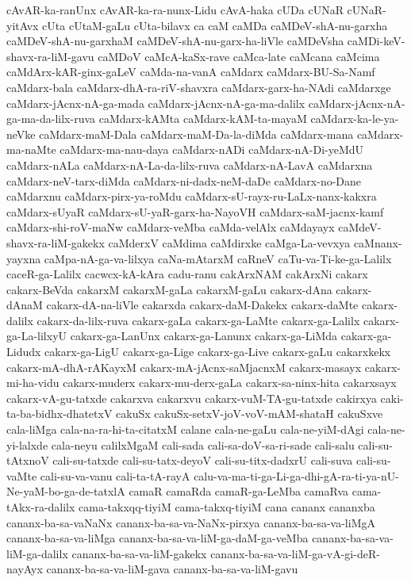 {cAvAR-ka-ranUnx
cAvAR-ka-ra-nunx-Lidu
cAvA-haka
cUDa
cUNaR
cUNaR-yitAvx
cUta
cUtaM-gaLu
cUta-bilavx
ca
caM
caMDa
caMDeV-shA-nu-garxha
caMDeV-shA-nu-garxhaM
caMDeV-shA-nu-garx-ha-liVle
caMDeVsha
caMDi-keV-shavx-ra-liM-gavu
caMDoV
caMcA-kaSx-rave
caMca-late
caMcana
caMcima
caMdArx-kAR-ginx-gaLeV
caMda-na-vanA
caMdarx
caMdarx-BU-Sa-Namf
caMdarx-bala
caMdarx-dhA-ra-riV-shavxra
caMdarx-garx-ha-NAdi
caMdarxge
caMdarx-jAcnx-nA-ga-mada
caMdarx-jAcnx-nA-ga-ma-dalilx
caMdarx-jAcnx-nA-ga-ma-da-lilx-ruva
caMdarx-kAMta
caMdarx-kAM-ta-mayaM
caMdarx-ka-le-ya-neVke
caMdarx-maM-Dala
caMdarx-maM-Da-la-diMda
caMdarx-mana
caMdarx-ma-naMte
caMdarx-ma-nau-daya
caMdarx-nADi
caMdarx-nA-Di-yeMdU
caMdarx-nALa
caMdarx-nA-La-da-lilx-ruva
caMdarx-nA-LavA
caMdarxna
caMdarx-neV-tarx-diMda
caMdarx-ni-dadx-neM-daDe
caMdarx-no-Dane
caMdarxnu
caMdarx-pirx-ya-roMdu
caMdarx-sU-rayx-ru-LaLx-nanx-kakxra
caMdarx-sUyaR
caMdarx-sU-yaR-garx-ha-NayoVH
caMdarx-saM-jacnx-kamf
caMdarx-shi-roV-maNw
caMdarx-veMba
caMda-velAlx
caMdayayx
caMdeV-shavx-ra-liM-gakekx
caMderxV
caMdima
caMdirxke
caMga-La-vevxya
caMnanx-yayxna
caMpa-nA-ga-va-lilxya
caNa-mAtarxM
caRneV
caTu-va-Ti-ke-ga-Lalilx
caceR-ga-Lalilx
cacwcx-kA-kAra
cadu-ranu
cakArxNAM
cakArxNi
cakarx
cakarx-BeVda
cakarxM
cakarxM-gaLa
cakarxM-gaLu
cakarx-dAna
cakarx-dAnaM
cakarx-dA-na-liVle
cakarxda
cakarx-daM-Dakekx
cakarx-daMte
cakarx-dalilx
cakarx-da-lilx-ruva
cakarx-gaLa
cakarx-ga-LaMte
cakarx-ga-Lalilx
cakarx-ga-La-lilxyU
cakarx-ga-LanUnx
cakarx-ga-Lanunx
cakarx-ga-LiMda
cakarx-ga-Lidudx
cakarx-ga-LigU
cakarx-ga-Lige
cakarx-ga-Live
cakarx-gaLu
cakarxkekx
cakarx-mA-dhA-rAKayxM
cakarx-mA-jAcnx-saMjacnxM
cakarx-masayx
cakarx-mi-ha-vidu
cakarx-muderx
cakarx-mu-derx-gaLa
cakarx-sa-ninx-hita
cakarxsayx
cakarx-vA-gu-tatxde
cakarxva
cakarxvu
cakarx-vuM-TA-gu-tatxde
cakirxya
caki-ta-ba-bidhx-dhatetxV
cakuSx
cakuSx-setxV-joV-voV-mAM-shataH
cakuSxve
cala-liMga
cala-na-ra-hi-ta-citatxM
calane
cala-ne-gaLu
cala-ne-yiM-dAgi
cala-ne-yi-lalxde
cala-neyu
calilxMgaM
cali-sada
cali-sa-doV-sa-ri-sade
cali-salu
cali-su-tAtxnoV
cali-su-tatxde
cali-su-tatx-deyoV
cali-su-titx-dadxrU
cali-suva
cali-su-vaMte
cali-su-va-vanu
cali-ta-tA-rayA
calu-va-ma-ti-ga-Li-ga-dhi-gA-ra-ti-ya-nU-Ne-yaM-bo-ga-de-tatxlA
camaR
camaRda
camaR-ga-LeMba
camaRva
cama-tAkx-ra-dalilx
cama-takxqq-tiyiM
cama-takxq-tiyiM
cana
cananx
cananxba
cananx-ba-sa-vaNaNx
cananx-ba-sa-va-NaNx-pirxya
cananx-ba-sa-va-liMgA
cananx-ba-sa-va-liMga
cananx-ba-sa-va-liM-ga-daM-ga-veMba
cananx-ba-sa-va-liM-ga-dalilx
cananx-ba-sa-va-liM-gakekx
cananx-ba-sa-va-liM-ga-vA-gi-deR-nayAyx
cananx-ba-sa-va-liM-gava
cananx-ba-sa-va-liM-gavu
}
